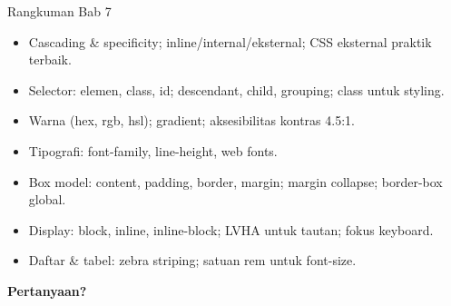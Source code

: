 \documentclass[handout]{beamer}
\begin{document}
\begin{frame}{Rangkuman Bab 7}
	\begin{itemize}
		\item Cascading \& specificity; inline/internal/eksternal; CSS eksternal praktik terbaik.
		\item Selector: elemen, class, id; descendant, child, grouping; class untuk styling.
		\item Warna (hex, rgb, hsl); gradient; aksesibilitas kontras 4.5:1.
		\item Tipografi: font-family, line-height, web fonts.
		\item Box model: content, padding, border, margin; margin collapse; border-box global.
		\item Display: block, inline, inline-block; LVHA untuk tautan; fokus keyboard.
		\item Daftar \& tabel: zebra striping; satuan rem untuk font-size.
	\end{itemize}
\end{frame}

\begin{frame}{}
	\centering
	\vfill
	\textbf{\Large Pertanyaan?}
	\vfill
\end{frame}
\end{document}

